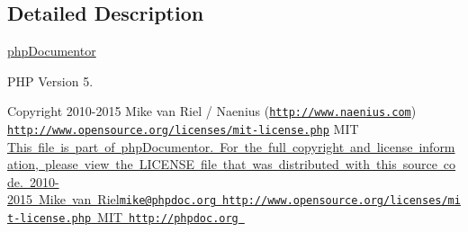 \subsection{Detailed Description}
\mbox{\hyperlink{namespacephp_documentor}{php\+Documentor}}

P\+HP Version 5.

\begin{DoxyCopyright}{Copyright}
2010-\/2015 Mike van Riel / Naenius (\href{http://www.naenius.com}{\tt http\+://www.\+naenius.\+com})  \href{http://www.opensource.org/licenses/mit-license.php}{\tt http\+://www.\+opensource.\+org/licenses/mit-\/license.\+php} M\+IT \mbox{\hyperlink{}{This file is part of php\+Documentor. For the full copyright and license information, please view the L\+I\+C\+E\+N\+SE file that was distributed with this source code.  2010-\/2015 Mike van Riel\href{mailto:mike@phpdoc.org}{\tt mike@phpdoc.\+org}  \href{http://www.opensource.org/licenses/mit-license.php}{\tt http\+://www.\+opensource.\+org/licenses/mit-\/license.\+php} M\+IT  \href{http://phpdoc.org}{\tt http\+://phpdoc.\+org} }}
\end{DoxyCopyright}
